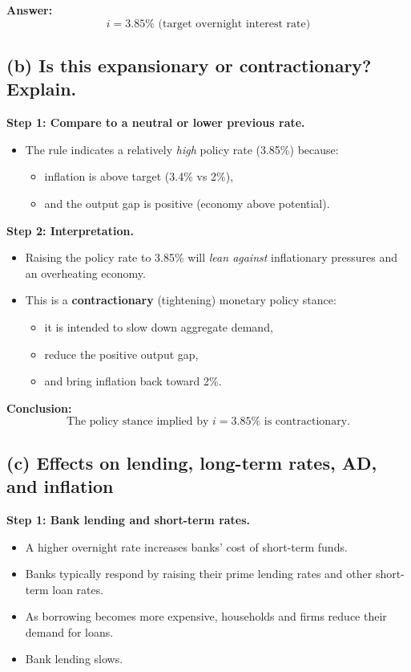 \documentclass[12pt]{article}
\begin{document}
\textbf{Answer:}
\[
\boxed{i = 3.85\% \text{ (target overnight interest rate)}}
\]

\subsection*{(b) Is this expansionary or contractionary? Explain.}

\textbf{Step 1: Compare to a neutral or lower previous rate.}
\begin{itemize}
    \item The rule indicates a relatively \emph{high} policy rate (3.85\%) because:
    \begin{itemize}
        \item inflation is above target (3.4\% vs 2\%),
        \item and the output gap is positive (economy above potential).
    \end{itemize}
\end{itemize}

\textbf{Step 2: Interpretation.}
\begin{itemize}
    \item Raising the policy rate to 3.85\% will \emph{lean against} inflationary pressures and an overheating economy.
    \item This is a \textbf{contractionary} (tightening) monetary policy stance:
    \begin{itemize}
        \item it is intended to slow down aggregate demand,
        \item reduce the positive output gap,
        \item and bring inflation back toward 2\%.
    \end{itemize}
\end{itemize}

\textbf{Conclusion:}
\[
\boxed{\text{The policy stance implied by } i = 3.85\% \text{ is contractionary.}}
\]

\subsection*{(c) Effects on lending, long-term rates, AD, and inflation}

\textbf{Step 1: Bank lending and short-term rates.}
\begin{itemize}
    \item A higher overnight rate increases banks' cost of short-term funds.
    \item Banks typically respond by raising their prime lending rates and other short-term loan rates.
    \item As borrowing becomes more expensive, households and firms reduce their demand for loans.
    \item Bank lending slows.
\end{itemize}
\end{document}
